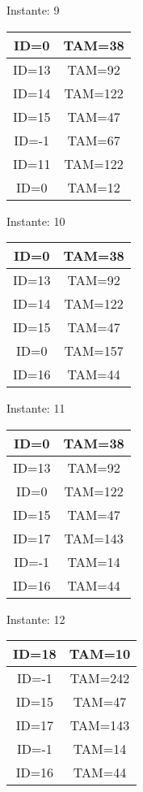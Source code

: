 \documentclass[10pt,a4paper]{article}
\begin{document}
\begin{center}

Instante: 9

\begin{tabular}{|c|c|}
\hline
ID=0 & TAM=38 \\ \hline
ID=13 & TAM=92 \\ \hline
ID=14 & TAM=122 \\ \hline
ID=15 & TAM=47 \\ \hline
ID=-1 & TAM=67 \\ \hline
ID=11 & TAM=122 \\ \hline
ID=0 & TAM=12 \\ \hline
\end{tabular}
\end{center}\pagebreak
\begin{center}

Instante: 10

\begin{tabular}{|c|c|}
\hline
ID=0 & TAM=38 \\ \hline
ID=13 & TAM=92 \\ \hline
ID=14 & TAM=122 \\ \hline
ID=15 & TAM=47 \\ \hline
ID=0 & TAM=157 \\ \hline
ID=16 & TAM=44 \\ \hline
\end{tabular}
\end{center}\pagebreak
\begin{center}

Instante: 11

\begin{tabular}{|c|c|}
\hline
ID=0 & TAM=38 \\ \hline
ID=13 & TAM=92 \\ \hline
ID=0 & TAM=122 \\ \hline
ID=15 & TAM=47 \\ \hline
ID=17 & TAM=143 \\ \hline
ID=-1 & TAM=14 \\ \hline
ID=16 & TAM=44 \\ \hline
\end{tabular}
\end{center}\pagebreak
\begin{center}

Instante: 12

\begin{tabular}{|c|c|}
\hline
ID=18 & TAM=10 \\ \hline
ID=-1 & TAM=242 \\ \hline
ID=15 & TAM=47 \\ \hline
ID=17 & TAM=143 \\ \hline
ID=-1 & TAM=14 \\ \hline
ID=16 & TAM=44 \\ \hline
\end{tabular}
\end{center}\pagebreak
\end{document}
